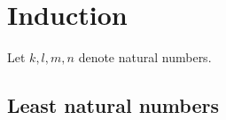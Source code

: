 \documentclass[../../natural-numbers.ftl.tex]{subfiles}
\begin{document}
  \section{Induction}
  
  \begin{forthel}
  \end{forthel}

  \begin{forthel}
    Let $k, l, m, n$ denote natural numbers.
  \end{forthel}


  \subsection{Least natural numbers}
\end{document}
